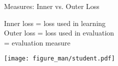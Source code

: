 \documentclass[11pt,compress,t,notes=noshow, xcolor=table]{beamer}
\begin{document}

\begin{vbframe}{Measures: Inner vs. Outer Loss}

\begin{center}
\lz
Inner loss = loss used in learning\\
\lz
Outer loss = loss used in evaluation\\
= evaluation measure
\lz

\texttt{[image: figure\_man/student.pdf]}\\

\end{center}

\end{vbframe}



% 
% 
% 
\end{document}
